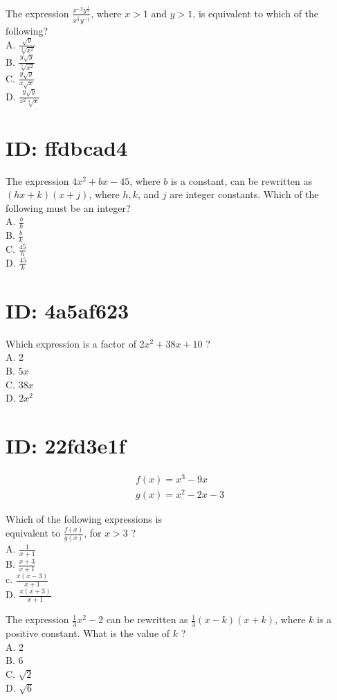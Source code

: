 The expression $\frac{x^{-2} y^{\frac{1}{2}}}{x^{\frac{1}{3}} y^{-1}}$, where $x>1$ and $y>1$, is equivalent to which of the following?\\
A. $\frac{\sqrt{y}}{\sqrt[3]{x^{2}}}$\\
B. $\frac{y \sqrt{y}}{\sqrt[3]{x^{2}}}$\\
C. $\frac{y \sqrt{y}}{x \sqrt{x}}$\\
D. $\frac{y \sqrt{y}}{x^{2} \sqrt[3]{x}}$

\section*{ID: ffdbcad4}
The expression $4 x^{2}+b x-45$, where $b$ is a constant, can be rewritten as $(h x+k)(x+j)$, where $h, k$, and $j$ are integer constants. Which of the following must be an integer?\\
A. $\frac{b}{h}$\\
B. $\frac{b}{k}$\\
C. $\frac{45}{h}$\\
D. $\frac{45}{k}$

\section*{ID: 4a5af623}
Which expression is a factor of $2 x^{2}+38 x+10$ ?\\
A. 2\\
B. $5 x$\\
C. $38 x$\\
D. $2 x^{2}$

\section*{ID: 22fd3e1f}
$$
\begin{gathered}
f(x)=x^{3}-9 x \\
g(x)=x^{2}-2 x-3
\end{gathered}
$$

Which of the following expressions is\\
equivalent to $\frac{f(x)}{g(x)}$, for $x>3$ ?\\
A. $\frac{1}{x+1}$\\
B. $\frac{x+3}{x+1}$\\
c. $\frac{x(x-3)}{x+1}$\\
D. $\frac{x(x+3)}{x+1}$

The expression $\frac{1}{3} x^{2}-2$ can be rewritten as $\frac{1}{3}(x-k)(x+k)$, where $k$ is a positive constant. What is the value of $k$ ?\\
A. 2\\
B. 6\\
C. $\sqrt{2}$\\
D. $\sqrt{6}$

